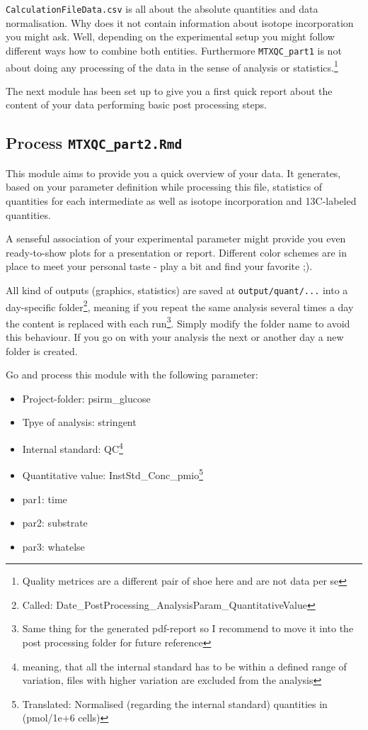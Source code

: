\documentclass[]{book}
\providecommand{\tightlist}{%
  \setlength{\itemsep}{0pt}\setlength{\parskip}{0pt}}
\let\rmarkdownfootnote\footnote%
\def\footnote{\protect\rmarkdownfootnote}
\theoremstyle{definition}
\theoremstyle{definition}
\theoremstyle{definition}
\theoremstyle{remark}
\begin{document}
\texttt{CalculationFileData.csv} is all about the absolute quantities
and data normalisation. Why does it not contain information about
isotope incorporation you might ask. Well, depending on the experimental
setup you might follow different ways how to combine both entities.
Furthermore \texttt{MTXQC\_part1} is not about doing any processing of
the data in the sense of analysis or statistics.\footnote{Quality
  metrices are a different pair of shoe here and are not data per se}

The next module has been set up to give you a first quick report about
the content of your data performing basic post processing steps.

\subsection{\texorpdfstring{Process
\texttt{MTXQC\_part2.Rmd}}{Process MTXQC\_part2.Rmd}}\label{process-mtxqc_part2.rmd}

This module aims to provide you a quick overview of your data. It
generates, based on your parameter definition while processing this
file, statistics of quantities for each intermediate as well as isotope
incorporation and 13C-labeled quantities.

A senseful association of your experimental parameter might provide you
even ready-to-show plots for a presentation or report. Different color
schemes are in place to meet your personal taste - play a bit and find
your favorite ;).

All kind of outputs (graphics, statistics) are saved at
\texttt{output/quant/...} into a day-specific folder\footnote{Called:
  Date\_PostProcessing\_AnalysisParam\_QuantitativeValue}, meaning if
you repeat the same analysis several times a day the content is replaced
with each run\footnote{Same thing for the generated pdf-report so I
  recommend to move it into the post processing folder for future
  reference}. Simply modify the folder name to avoid this behaviour. If
you go on with your analysis the next or another day a new folder is
created.

Go and process this module with the following parameter:

\begin{itemize}
\tightlist
\item
  Project-folder: psirm\_glucose
\item
  Tpye of analysis: stringent
\item
  Internal standard: QC\footnote{meaning, that all the internal standard
    has to be within a defined range of variation, files with higher
    variation are excluded from the analysis}
\item
  Quantitative value: InstStd\_Conc\_pmio\footnote{Translated:
    Normalised (regarding the internal standard) quantities in
    (pmol/1e+6 cells)}
\item
  par1: time
\item
  par2: substrate
\item
  par3: whatelse
\end{itemize}
\end{document}
